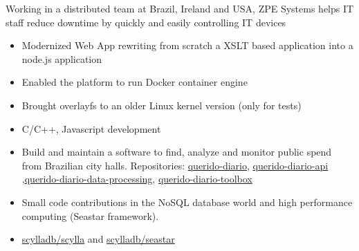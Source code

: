 \documentclass[10pt,a4paper]{altacv}
\begin{document}
\divider

Working in a distributed team at Brazil, Ireland and USA, ZPE Systems helps IT staff reduce downtime by quickly and easily controlling IT devices
\begin{itemize}
\item Modernized Web App rewriting from scratch  a XSLT based application into a node.js application 
\item Enabled the platform to run Docker container engine
\item Brought overlayfs to an older Linux kernel version (only for tests)
\item C/C++, Javascript development
\end{itemize}




\begin{itemize}
\item Build and maintain a software to find, analyze and monitor public spend from Brazilian city halls. Repositories: \href{https://github.com/okfn-brasil/querido-diario}{querido-diario}, \href{https://github.com/okfn-brasil/querido-diario-api}{querido-diario-api}
,\href{https://github.com/okfn-brasil/querido-diario-data-processing}{querido-diario-data-processing}, \href{https://github.com/okfn-brasil/querido-diario-toolbox/}{querido-diario-toolbox}

\end{itemize}


\begin{itemize}
\item Small code contributions in the NoSQL database world and high performance computing (Seastar framework).
\item \href{https://github.com/scylladb/scylla/}{scylladb/scylla} and \href{https://github.com/scylladb/seastar}{scylladb/seastar}
\end{itemize}
\end{document}
